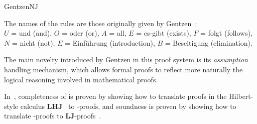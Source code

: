 \begin{entry}{GentzenNJ}
\begin{clarifications}
The names of the rules are those originally given by Gentzen~\cite{Gentzen1935}: \\
$U$ = und (and), $O$ = oder (or), $A$ = all, $E$ = es-gibt (exists), $F$ = folgt (follows), \\ 
$N$ = nicht (not), $E$ = Einf\"uhrung (introduction), $B$ = Beseitigung (elimination).
\end{clarifications}


\begin{history}
The main novelty introduced by Gentzen in this proof system is its 
\emph{assumption} handling mechanism, which allows formal proofs to reflect 
more naturally the logical reasoning involved in mathematical proofs.
\end{history}

\newcommand{\LHJ}{\ensuremath{\mathbf{LHJ}}\xspace}

\begin{technicalities}
In~\cite{Gentzen1935}, completeness of \NJ is proven by showing how to translate
proofs in the Hilbert-style calculus \LHJ~ to \NJ-proofs, and
soundness is proven by showing how to translate \NJ-proofs to
$\mathbf{LJ}$-proofs~.
\end{technicalities}


\end{entry}

